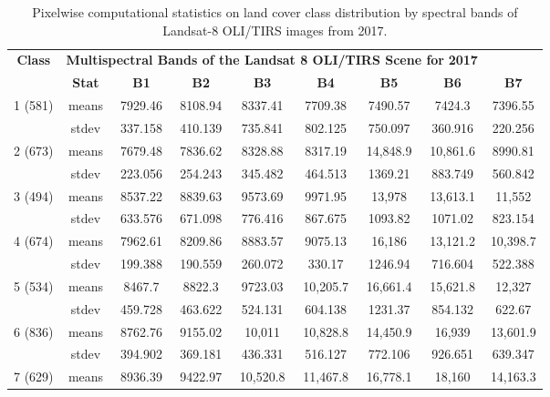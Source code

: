 \documentclass[jmse,article,accept,pdftex,oneauthor]{Definitions/mdpi}
\begin{document}
\begin{table}[H]
\small
  \caption{Pixelwise computational statistics on land cover class distribution by spectral bands of Landsat-8 OLI/TIRS images from 2017.   \label{tab05}}
 
 \setlength{\tabcolsep}{2.33mm}
   \begin{tabular}{ccccccccc}
  \toprule
  \multirow{2}{*}{\textbf{Class}} & \multicolumn{7}{c}{\textbf{Multispectral Bands of the Landsat 8 OLI/TIRS Scene for} \textbf{2017}} \\
    & \textbf{Stat} & \textbf{B1} & \textbf{B2} & \textbf{B3} & \textbf{B4} & \textbf{B5} & \textbf{B6} & \textbf{B7} \\
    \midrule
    \multirow{2}{*}{1 (581)} & means & 7929.46 & 8108.94 & 8337.41 & 7709.38 & 7490.57 & 7424.3 & 7396.55 \\
    & stdev & 337.158 & 410.139 & 735.841 & 802.125 & 750.097 & 360.916 & 220.256 \\
    \midrule
    \multirow{2}{*}{2 (673)} & means & 7679.48 & 7836.62 & 8328.88 & 8317.19 & 14,848.9 & 10,861.6 & 8990.81 \\
    & stdev & 223.056 & 254.243 & 345.482 & 464.513 & 1369.21 & 883.749 & 560.842 \\
    \midrule
    \multirow{2}{*}{3 (494)} & means & 8537.22 & 8839.63 & 9573.69 & 9971.95 & 13,978 & 13,613.1 & 11,552 \\
    & stdev & 633.576 & 671.098 & 776.416 & 867.675 & 1093.82 & 1071.02 & 823.154 \\
    \midrule
    \multirow{2}{*}{4 (674)} & means & 7962.61 & 8209.86 & 8883.57 & 9075.13 & 16,186 & 13,121.2 & 10,398.7 \\
    & stdev & 199.388 & 190.559 & 260.072 & 330.17 & 1246.94 & 716.604 & 522.388 \\
    \midrule
    \multirow{2}{*}{5 (534)} & means & 8467.7 & 8822.3 & 9723.03 & 10,205.7 &16,661.4 & 15,621.8 & 12,327 \\
    & stdev & 459.728 & 463.622 & 524.131 & 604.138 & 1231.37 & 854.132 & 622.67 \\
    \midrule
    \multirow{2}{*}{6 (836)} & means & 8762.76 & 9155.02 & 10,011 & 10,828.8 & 14,450.9 & 16,939 & 13,601.9 \\
    & stdev & 394.902 & 369.181 & 436.331 & 516.127 & 772.106 & 926.651 & 639.347 \\
    \midrule
    \multirow{2}{*}{7 (629)} & means & 8936.39 & 9422.97 & 10,520.8 & 11,467.8 & 16,778.1 & 18,160 & 14,163.3 \\

\end{tabular}
\end{table}
\end{document}
